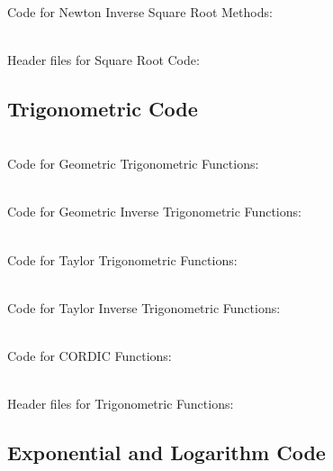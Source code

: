 \\Code for Newton Inverse Square Root Methods:


\\Header files for Square Root Code:





\subsection{Trigonometric Code}
\label{SUB_"Trigonometric Code"}

\\Code for Geometric Trigonometric Functions:


\\Code for Geometric Inverse Trigonometric Functions:


\\Code for Taylor Trigonometric Functions:


\\Code for Taylor Inverse Trigonometric Functions:


\\Code for CORDIC Functions:


\\Header files for Trigonometric Functions:






\subsection{Exponential and Logarithm Code}
\label{SUB_"Exponential and Logarithm Code"}

